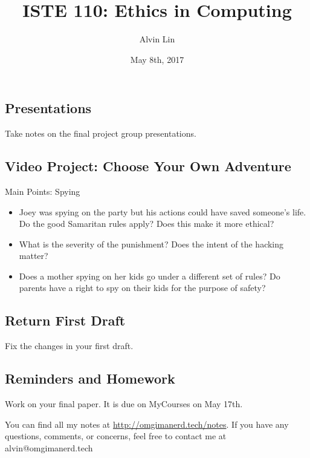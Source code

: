 \documentclass[letterpaper, 12pt]{article}
\title{ISTE 110: Ethics in Computing}
\author{Alvin Lin}
\date{May 8th, 2017}
\begin{document}
\maketitle

\subsection*{Presentations}
Take notes on the final project group presentations.

\subsection*{Video Project: Choose Your Own Adventure}
Main Points: Spying
\begin{itemize}
  \item Joey was spying on the party but his actions could have saved someone's
    life. Do the good Samaritan rules apply? Does this make it more ethical?
  \item What is the severity of the punishment? Does the intent of the hacking
    matter?
  \item Does a mother spying on her kids go under a different set of rules? Do
    parents have a right to spy on their kids for the purpose of safety?
\end{itemize}

\subsection*{Return First Draft}
Fix the changes in your first draft.

\subsection*{Reminders and Homework}
Work on your final paper. It is due on MyCourses on May 17th.

\begin{center}
  You can find all my notes at \url{http://omgimanerd.tech/notes}. If you have
  any questions, comments, or concerns, feel free to contact me at
  alvin@omgimanerd.tech
\end{center}
\end{document}
